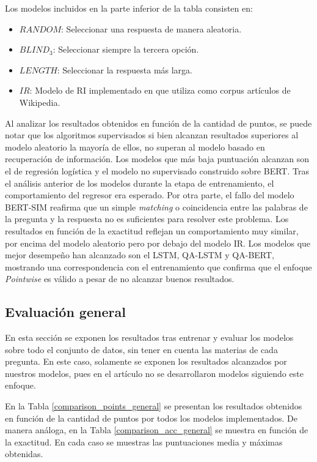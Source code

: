 Los modelos incluidos en la parte inferior de la tabla consisten en:
\begin{itemize}
  \item $RANDOM$: Seleccionar una respuesta de manera aleatoria.
  \item $BLIND_3$: Seleccionar siempre la tercera opción.
  \item $LENGTH$: Seleccionar la respuesta más larga.
  \item $IR$: Modelo de RI implementado en \cite{2019-head-qa} que utiliza como corpus artículos de Wikipedia.
\end{itemize}

Al analizar los resultados obtenidos en función de la cantidad de puntos, se puede notar que los algoritmos supervisados si bien alcanzan resultados superiores al modelo aleatorio la mayoría de ellos, no superan al modelo basado en recuperación de información. Los modelos que más baja puntuación alcanzan son el de regresión logística y el modelo no supervisado construido sobre BERT.
Tras el análisis anterior de los modelos durante la etapa de entrenamiento, el comportamiento del regresor era esperado. Por otra parte, el fallo del modelo BERT-SIM reafirma que un simple \textit{matching} o coincidencia entre las palabras de la pregunta y la respuesta no es suficientes para resolver este problema. Los resultados en función de la exactitud reflejan un comportamiento muy similar, por encima del modelo aleatorio pero por debajo del modelo IR. Los modelos que mejor desempeño han alcanzado son el LSTM, QA-LSTM y QA-BERT, mostrando una correspondencia con el entrenamiento que confirma que el enfoque \textit{Pointwise} es válido a pesar de no alcanzar buenos resultados.

\subsection{Evaluación general}

En esta sección se exponen los resultados tras entrenar y evaluar los modelos sobre todo el conjunto de datos, sin tener en cuenta las materias de cada pregunta. En este caso, solamente se exponen los resultados alcanzados por nuestros modelos, pues en el artículo \cite{2019-head-qa} no se desarrollaron modelos siguiendo este enfoque. 

En la Tabla \ref{comparison_points_general} se presentan los resultados obtenidos en función de la cantidad de puntos por todos los modelos implementados. De manera análoga, en la Tabla \ref{comparison_acc_general} se muestra en función de la exactitud. En cada caso se muestras las puntuaciones media y máximas obtenidas.

